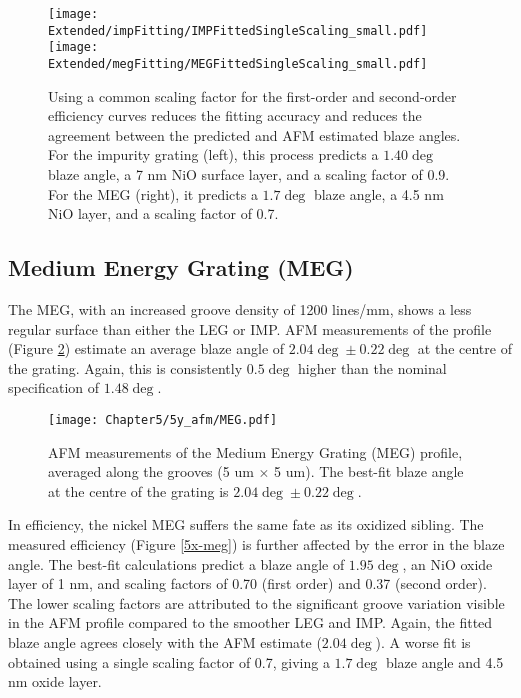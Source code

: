 \begin{figure}[htbp] %
   \centering
   \texttt{[image: Extended/impFitting/IMPFittedSingleScaling\_small.pdf]} 
     \texttt{[image: Extended/megFitting/MEGFittedSingleScaling\_small.pdf]} 
   \caption{Using a common scaling factor for the first-order and second-order efficiency curves reduces the fitting accuracy and reduces the agreement between the predicted and AFM estimated blaze angles.  For the impurity grating (left), this process predicts a $1.40\deg$ blaze angle, a 7 nm NiO surface layer, and a scaling factor of 0.9.  For the MEG (right), it predicts a $1.7\deg$ blaze angle, a 4.5 nm NiO layer, and a scaling factor of 0.7.}
   \label{singleScalingFit}
\end{figure}

\subsection{Medium Energy Grating (MEG)}
The MEG, with an increased groove density of 1200 lines/mm, shows a less regular surface than either the LEG or IMP.  AFM measurements of the profile (Figure \ref{5y-meg}) estimate an average blaze angle of $2.04\deg \pm 0.22\deg$ at the centre of the grating.  Again, this is consistently $0.5\deg$ higher than the nominal specification of $1.48\deg$.

\begin{figure}[htbp] %
   \centering
   \texttt{[image: Chapter5/5y\_afm/MEG.pdf]} 
   \caption{AFM measurements of the Medium Energy Grating (MEG) profile, averaged along the grooves (5 um $\times$ 5 um).  The best-fit blaze angle at the centre of the grating is $2.04\deg \pm 0.22\deg$.}
   \label{5y-meg}
\end{figure}

In efficiency, the nickel MEG suffers the same fate as its oxidized sibling.  The measured efficiency (Figure \ref{5x-meg}) is further affected by the error in the blaze angle.  The best-fit calculations predict a blaze angle of $1.95\deg$, an NiO oxide layer of 1 nm, and scaling factors of 0.70 (first order) and 0.37 (second order).  The lower scaling factors are attributed to the significant groove variation visible in the AFM profile compared to the smoother LEG and IMP.  Again, the fitted blaze angle agrees closely with the AFM estimate ($2.04\deg$).  A worse fit is obtained using a single scaling factor of 0.7, giving a $1.7\deg$ blaze angle and 4.5 nm oxide layer.

